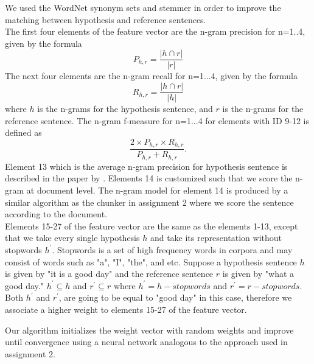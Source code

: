 \documentclass[11pt,letterpaper]{article}
\begin{document}

We used the WordNet synonym sets and stemmer in order to improve the matching between hypothesis and reference sentences. \\
The first four elements of the feature vector are the n-gram precision for n=1..4, given by the formula
\[P_{h, r} =  \frac{| h \cap r | }{ | r |}  \]
The next four elements are the n-gram recall for n=1...4, given by the formula
\[R_{h, r} =  \frac{| h \cap r | }{ | h |}  \]
where $h$ is the n-grams for the hypothesis sentence, and $r$ is the n-grams for the reference sentence. 
The n-gram f-measure for n=1...4 for elements with ID 9-12 is defined as
\[ \frac{2 \times P_{h, r} \times R_{h,r}}{P_{h, r} + R_{h, r}}. \]
Element 13 which is the average n-gram precision for hypothesis sentence is described in the paper by \cite{song2011regression}.
Elements 14 is customized such that we score the n-gram at document level. The n-gram model for element 14 is produced by a similar algorithm as the chunker in assignment 2 where we score the sentence according to the document.\\
Elements 15-27 of the feature vector are the same as the elements 1-13, except that we take every single hypothesis $h$ and take its representation without stopwords $h^{\prime}$. Stopwords is a set of high frequency words in corpora and may consist of words such as "a", "I", "the", and etc. Suppose a hypothesis sentence $h$ is given by "it is a good day" and the reference sentence $r$ is given by "what a good day." $h^{\prime} \subseteq h$ and $r^{\prime} \subseteq r$ where $h^{\prime} = h - stopwords$ and $r^{\prime} = r - stopwords$. Both $h^{\prime}$ and $r^{\prime}$, are going to be equal to "good day" in this case, therefore we associate a higher weight to elements 15-27 of the feature vector. 

Our algorithm initializes the weight vector with random weights and improve until convergence using a neural network analogous to the approach used in assignment 2. 
\end{document}
